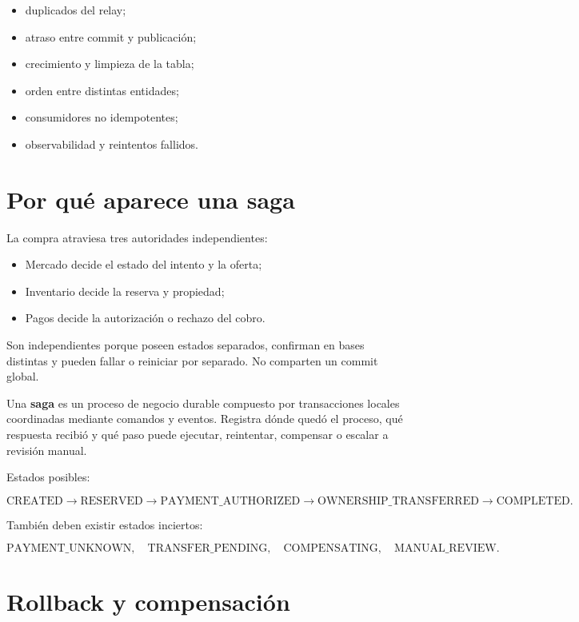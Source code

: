 \documentclass[variant=apuntes,cover=institutional,mode=screen]{ua-engineering-v6-article}
\begin{document}
\begin{itemize}
\item duplicados del relay;
\item atraso entre commit y publicación;
\item crecimiento y limpieza de la tabla;
\item orden entre distintas entidades;
\item consumidores no idempotentes;
\item observabilidad y reintentos fallidos.
\end{itemize}

\section{Por qué aparece una saga}

La compra atraviesa tres autoridades independientes:

\begin{itemize}
\item Mercado decide el estado del intento y la oferta;
\item Inventario decide la reserva y propiedad;
\item Pagos decide la autorización o rechazo del cobro.
\end{itemize}

Son independientes porque poseen estados separados, confirman en bases distintas y pueden fallar o reiniciar por separado. No comparten un commit global.

Una \textbf{saga} es un proceso de negocio durable compuesto por transacciones locales coordinadas mediante comandos y eventos. Registra dónde quedó el proceso, qué respuesta recibió y qué paso puede ejecutar, reintentar, compensar o escalar a revisión manual.

Estados posibles:

\[
\text{CREATED}\rightarrow\text{RESERVED}\rightarrow\text{PAYMENT\_AUTHORIZED}
\rightarrow\text{OWNERSHIP\_TRANSFERRED}\rightarrow\text{COMPLETED}.
\]

También deben existir estados inciertos:

\[
\text{PAYMENT\_UNKNOWN},\quad
\text{TRANSFER\_PENDING},\quad
\text{COMPENSATING},\quad
\text{MANUAL\_REVIEW}.
\]

\section{Rollback y compensación}
\end{document}
